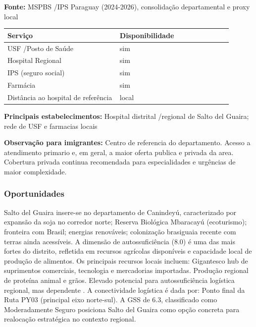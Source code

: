 \textbf{Fonte:} MSPBS /\allowbreak  IPS Paraguay (2024-2026), consolidação
departamental e proxy local

{\def\LTcaptype{none} %
\begin{longtable}{@{}>{\raggedright\arraybackslash}p{0.45\linewidth} >{\raggedright\arraybackslash}p{0.45\linewidth}@{}}
\toprule\noalign{}
Serviço & Disponibilidade \\
\midrule\noalign{}
\endhead
\bottomrule\noalign{}
\endlastfoot
USF /\allowbreak  Posto de Saúde & sim \\
Hospital Regional & sim \\
IPS (seguro social) & sim \\
Farmácia & sim \\
Distância ao hospital de referência & local \\
\end{longtable}
}

\textbf{Principais estabelecimentos:} Hospital distrital /\allowbreak  regional de
Salto del Guaira; rede de USF e farmacias locais

\textbf{Observação para imigrantes:} Centro de referencia do
departamento. Acesso a atendimento primario e, em geral, a maior oferta
publica e privada da area. Cobertura privada continua recomendada para
especialidades e urgências de maior complexidade.
\newpage

\subsubsection*{Oportunidades}\label{oport-salto-del-guaira-1401}
Salto del Guaira insere-se no departamento de Canindeyú, caracterizado por expansão da soja no corredor norte; Reserva Biológica Mbaracayú (ecoturismo); fronteira com Brasil; energias renováveis; colonização brasiguaia recente com terras ainda acessíveis. A dimensão de autossuficiência (8.0) é uma das mais fortes do distrito, refletida em recursos agrícolas disponíveis e capacidade local de produção de alimentos. Os principais recursos locais incluem: Gigantesco hub de suprimentos comerciais, tecnologia e mercadorias importadas. Produção regional de proteína animal e grãos. Elevado potencial para autossuficiência logística regional, mas dependente . A conectividade logística é dada por: Ponto final da Ruta PY03 (principal eixo norte-sul). A GSS de 6.3, classificado como Moderadamente Seguro posiciona Salto del Guaira como opção concreta para realocação estratégica no contexto regional.

